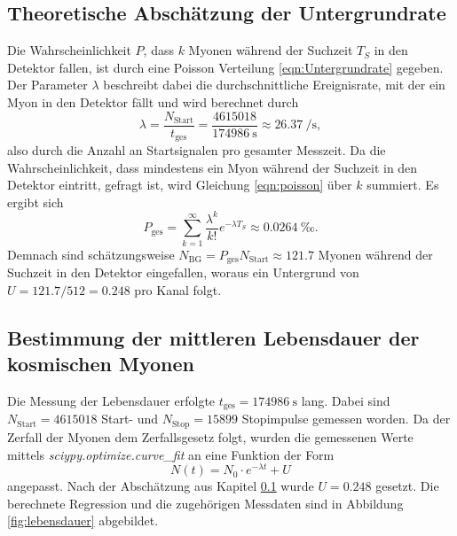 \subsection{Theoretische Abschätzung der Untergrundrate}
\label{sec:untergrund}
Die Wahrscheinlichkeit $P$, dass $k$ Myonen während der Suchzeit $T_S$ in den Detektor fallen, ist durch eine Poisson Verteilung \ref{eqn:Untergrundrate}
gegeben. Der Parameter $\lambda$ beschreibt dabei die durchschnittliche Ereignisrate, mit der ein Myon in den Detektor fällt und wird berechnet durch 
\begin{equation*}
  \lambda=\frac{N_\text{Start}}{t_\text{ges}}=\frac{\num{4615018}}{\SI{174986}{\second}}\approx \SI{26.37}{\per\second},
\end{equation*}
also durch die Anzahl an Startsignalen pro gesamter Messzeit. Da die Wahrscheinlichkeit, dass mindestens ein Myon während der Suchzeit in den Detektor eintritt,
gefragt ist, wird Gleichung \ref{eqn:poisson} über $k$ summiert. Es ergibt sich
\begin{equation*}
  P_{\text{ges}}=\sum_{k=1}^\infty\frac{\lambda^k}{k!}e^{-\lambda T_S}\approx\SI{0.0264}{‰}.
\end{equation*}
Demnach sind schätzungsweise $N_{\text{BG}}=P_{\text{ges}}N_{\text{Start}}\approx\num{121.7}$ Myonen während der Suchzeit in den Detektor eingefallen, woraus ein Untergrund
von $U=121.7/512=0.248$ pro Kanal folgt.

\subsection{Bestimmung der mittleren Lebensdauer der kosmischen Myonen}
\label{sec:lebensdauer}
Die Messung der Lebensdauer erfolgte $t_\text{ges}=\SI{174986}{\second}$ lang. Dabei sind $N_\text{Start}=\num{4615018}$ Start- und  $N_\text{Stop}=\num{15899}$
Stopimpulse gemessen worden. 
\noindent
Da der Zerfall der Myonen dem Zerfallsgesetz folgt, wurden die gemessenen Werte mittels \textit{sciypy.optimize.curve\_fit} an eine Funktion der Form 
\begin{equation}
  N(t)=N_0\cdot e^{-\lambda t}+U \label{eqn:expo}
\end{equation}
angepasst. Nach der Abschätzung aus Kapitel \ref{sec:untergrund} wurde $U=0.248$ gesetzt. Die berechnete Regression und die zugehörigen Messdaten sind in Abbildung 
\ref{fig:lebensdauer} abgebildet.

